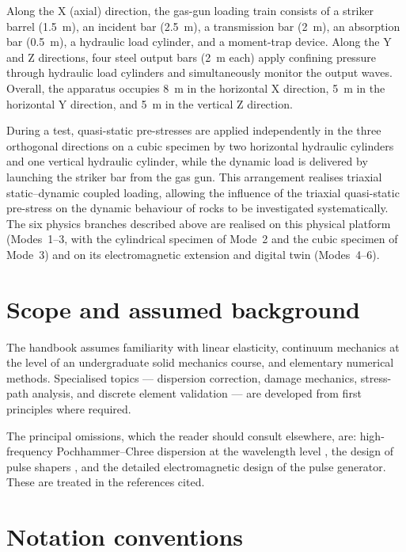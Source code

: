 \documentclass[11pt,a4paper,openany]{book}
\providecommand{\SI}[2]{\qty{#1}{#2}}
\theoremstyle{handbook}
\begin{document}
Along the X (axial) direction, the gas-gun loading train consists of a
striker barrel (\SI{1.5}{m}), an incident bar (\SI{2.5}{m}), a transmission
bar (\SI{2}{m}), an absorption bar (\SI{0.5}{m}), a hydraulic load cylinder,
and a moment-trap device. Along the Y and Z directions, four steel output
bars (\SI{2}{m} each) apply confining pressure through hydraulic load
cylinders and simultaneously monitor the output waves. Overall, the
apparatus occupies \SI{8}{m} in the horizontal X direction, \SI{5}{m} in the
horizontal Y direction, and \SI{5}{m} in the vertical Z direction.

During a test, quasi-static pre-stresses are applied independently in the
three orthogonal directions on a cubic specimen by two horizontal hydraulic
cylinders and one vertical hydraulic cylinder, while the dynamic load is
delivered by launching the striker bar from the gas gun. This arrangement
realises triaxial static--dynamic coupled loading, allowing the influence of
the triaxial quasi-static pre-stress on the dynamic behaviour of rocks to be
investigated systematically. The six physics branches described above are
realised on this physical platform (Modes~1--3, with the cylindrical
specimen of Mode~2 and the cubic specimen of Mode~3) and on its
electromagnetic extension and digital twin (Modes~4--6).

\section{Scope and assumed background}

The handbook assumes familiarity with linear elasticity, continuum mechanics
at the level of an undergraduate solid mechanics course, and elementary
numerical methods. Specialised topics --- dispersion correction, damage
mechanics, stress-path analysis, and discrete element validation --- are
developed from first principles where required.

The principal omissions, which the reader should consult elsewhere, are:
high-frequency Pochhammer--Chree dispersion at the wavelength level
\cite{Davies1948,GrahamPC}, the design of pulse shapers
\cite{FrewForrestal2002}, and the detailed electromagnetic design of the
pulse generator. These are treated in the references cited.

\section{Notation conventions}
\end{document}
